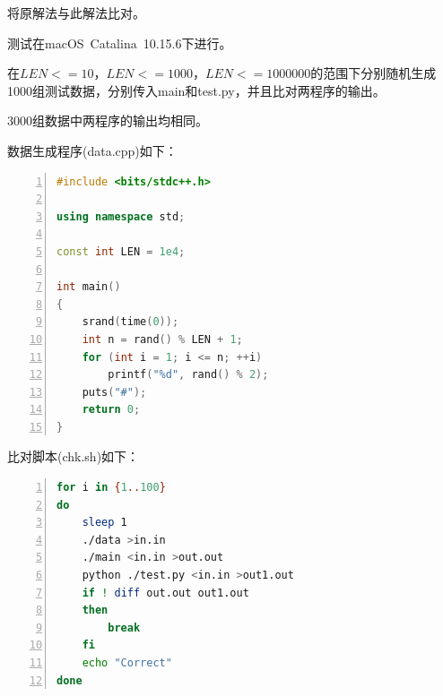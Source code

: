 \documentclass{article}
\begin{document}
将原解法与此解法比对。

测试在macOS\ Catalina\ 10.15.6下进行。

在$LEN<=10$，$LEN<=1000$，$LEN<=1000000$的范围下分别随机生成1000组测试数据，分别传入main和test.py，并且比对两程序的输出。

3000组数据中两程序的输出均相同。

数据生成程序(data.cpp)如下：

\begin{lstlisting}[language={C++},
    numbers=left,
    numberstyle=\tiny\consolas,
    basicstyle=\small\consolas]
#include <bits/stdc++.h>

using namespace std;

const int LEN = 1e4;

int main()
{
    srand(time(0));
    int n = rand() % LEN + 1;
    for (int i = 1; i <= n; ++i)
        printf("%d", rand() % 2);
    puts("#");
    return 0;
}
\end{lstlisting}

比对脚本(chk.sh)如下：

\begin{lstlisting}[language={bash},
    numbers=left,
    numberstyle=\tiny\consolas,
    basicstyle=\small\consolas]
for i in {1..100}
do
    sleep 1
    ./data >in.in
    ./main <in.in >out.out
    python ./test.py <in.in >out1.out
    if ! diff out.out out1.out
    then
        break
    fi
    echo "Correct"
done
\end{lstlisting}
\end{document}
